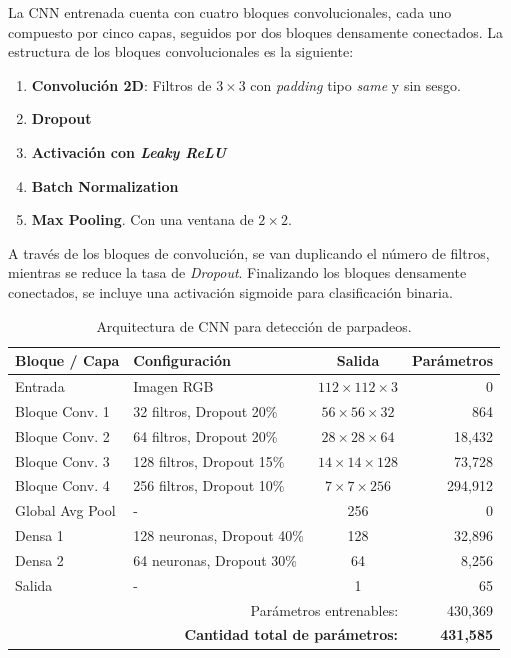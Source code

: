 La CNN entrenada cuenta con cuatro bloques convolucionales, cada uno compuesto por cinco capas, seguidos por dos bloques densamente conectados. La estructura de los bloques convolucionales es la siguiente:
\begin{enumerate}[noitemsep,topsep=0pt]
    \item \textbf{Convolución 2D}: Filtros de $3\times3$ con \textit{padding} tipo \textit{same} y sin sesgo.
    \item \textbf{Dropout}
    \item \textbf{Activación con \textit{Leaky ReLU}}
    \item \textbf{Batch Normalization}
    \item \textbf{Max Pooling}. Con una ventana de $2\times2$.
\end{enumerate}

A través de los bloques de convolución, se van duplicando el número de filtros, mientras se reduce la tasa de \textit{Dropout}. Finalizando los bloques densamente conectados, se incluye una activación sigmoide para clasificación binaria.

\begin{table}[h!]
    \centering
    \small
    \renewcommand{\arraystretch}{1.2}
    \begin{tabular}{llcr}
        \hline
        \textbf{Bloque / Capa} & \textbf{Configuración} & \textbf{Salida} & \textbf{Parámetros} \\
        \hline
        Entrada & Imagen RGB & $112 \times 112 \times 3$ & 0 \\
        \hline
        Bloque Conv. 1 & 32 filtros, Dropout 20\% & $56 \times 56 \times 32$ & 864 \\
        Bloque Conv. 2 & 64 filtros, Dropout 20\% & $28 \times 28 \times 64$ & 18,432 \\
        Bloque Conv. 3 & 128 filtros, Dropout 15\% & $14 \times 14 \times 128$ & 73,728 \\
        Bloque Conv. 4 & 256 filtros, Dropout 10\% & $7 \times 7 \times 256$ & 294,912 \\
        \hline
        Global Avg Pool & - & 256 & 0 \\
        Densa 1 & 128 neuronas, Dropout 40\% & 128 & 32,896 \\
        Densa 2 & 64 neuronas, Dropout 30\% & 64 & 8,256 \\
        Salida & - & 1 & 65 \\
        \hline
        \multicolumn{3}{r}{Parámetros entrenables:} & 430,369 \\
        \hline
        \multicolumn{3}{r}{\textbf{Cantidad total de parámetros:}} & \textbf{431,585} \\
        \hline
    \end{tabular}
    \caption{Arquitectura de CNN para detección de parpadeos.}
    \label{tab:tabla CNN parpadeo}
\end{table}

